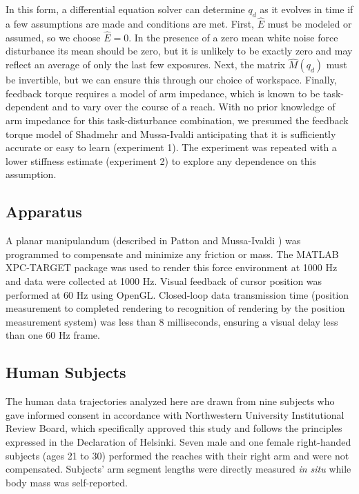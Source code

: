 \documentclass[letterpaper, 10 pt, conference]{ieeeconf}  %
\begin{document}
In this form, a differential equation solver can determine $q_d$ as it evolves in time if a few assumptions are made and conditions are met. First, $\hat{E}$ must be modeled or assumed, so we choose $\hat{E}=0$. In the presence of a zero mean white noise force disturbance its mean should be zero, but it is unlikely to be exactly zero and may reflect an average of only the last few exposures\cite{scheidt2001learning}. Next, the matrix $\hat{M}(q_d)$ must be invertible, but we can ensure this through our choice of workspace. Finally, feedback torque requires a model of arm impedance, which is known to be task-dependent\cite{} and to vary over the course of a reach\cite{shapiro}. With no prior knowledge of arm impedance for this task-disturbance combination, we presumed the feedback torque model of Shadmehr and Mussa-Ivaldi anticipating that it is sufficiently accurate or easy to learn (experiment 1). The experiment was repeated with a lower stiffness estimate (experiment 2) to explore any dependence on this assumption.

\subsection*{Apparatus}
A planar manipulandum (described in Patton and Mussa-Ivaldi \cite{patton2004robot}) was programmed to compensate and minimize any friction or mass. The MATLAB XPC-TARGET package \cite{MATLAB:2008} was used to render this force environment at 1000 Hz and data were collected at 1000 Hz.  Visual feedback of cursor position was performed at 60 Hz using OpenGL. Closed-loop data transmission time (position measurement to completed rendering to recognition of rendering by the position measurement system) was less than 8 milliseconds, ensuring a visual delay less than one 60 Hz frame.

\subsection*{Human Subjects}
The human data trajectories analyzed here are drawn from nine subjects who gave informed consent in accordance with Northwestern University Institutional Review Board, which specifically approved this study and follows the principles expressed in the Declaration of Helsinki. Seven male and one female right-handed subjects (ages 21 to 30) performed the reaches with their right arm and were not compensated. Subjects' arm segment lengths were directly measured \textit{in situ} while body mass was self-reported.
\end{document}
